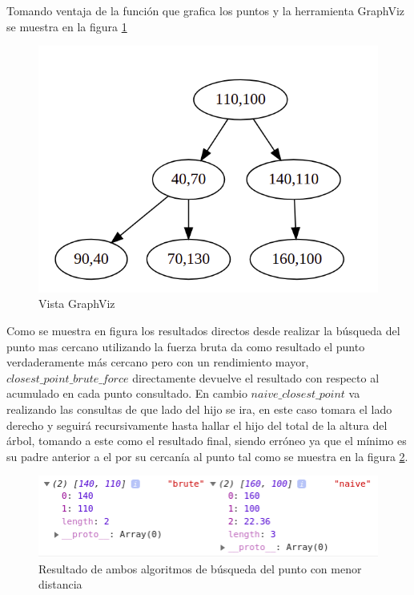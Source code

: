 \documentclass{article}
\begin{document}
		    Tomando ventaja de la función que grafica los puntos y la herramienta GraphViz se muestra en la figura \ref{fig:query1}
		    
		    \begin{figure}[H]
    			\centering
    			\includegraphics[scale=0.35]{img/query1.png}
    			\caption{Vista GraphViz}
    			\label{fig:query1}
    		\end{figure}
		
		    
		    Como se muestra en figura los resultados directos desde realizar la búsqueda del punto mas cercano utilizando la fuerza bruta da como resultado el punto verdaderamente más cercano pero con un rendimiento mayor, $closest\_point\_brute\_force$ directamente devuelve el resultado con respecto al acumulado en cada punto consultado. En cambio $naive\_closest\_point$ va realizando las consultas de que lado del hijo se ira, en este caso tomara el lado derecho y seguirá recursivamente hasta hallar el hijo del total de la altura del árbol, tomando a este como el resultado final, siendo erróneo ya que el mínimo es su padre anterior a el por su cercanía al punto tal como se muestra en la figura \ref{fig:query2}.
		    
		    \begin{figure}[H]
    			\centering
    			\includegraphics[scale=0.45]{img/query2_result.png}
    			\caption{Resultado de ambos algoritmos de búsqueda del punto con menor distancia}
    			\label{fig:query2}
    		\end{figure}
		    
\end{document}
